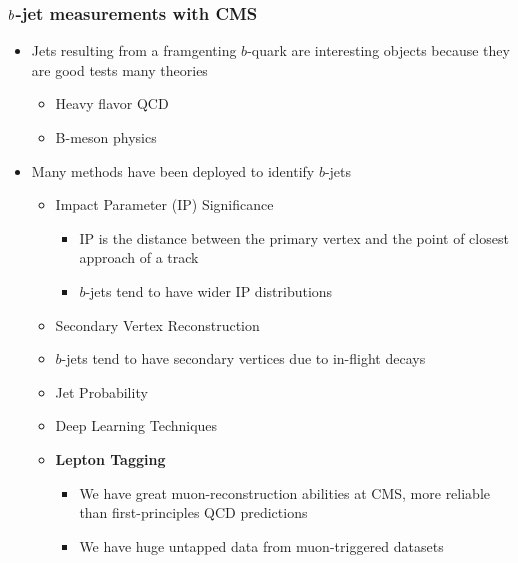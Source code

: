 \begin{frame}
  \frametitle{$\boldmath{b}$\textbf{-jet measurements with CMS}}
  \begin{itemize}
  \item Jets resulting from a framgenting $b$-quark are interesting objects because they are good tests many theories
    \begin{itemize}
    \item Heavy flavor QCD
    \item B-meson physics
    \end{itemize}
  \item Many methods have been deployed to identify $b$-jets
    \begin{itemize}
    \item Impact Parameter (IP) Significance
      \begin{itemize}
      \item IP is the distance between the primary vertex and the point of closest approach of a track
      \item $b$-jets tend to have wider IP distributions
      \end{itemize}
    \item Secondary Vertex Reconstruction
    \item $b$-jets tend to have secondary vertices due to in-flight decays
    \item Jet Probability
    \item Deep Learning Techniques
    \item \textbf{Lepton Tagging}
      \begin{itemize}
      \item We have great muon-reconstruction abilities at CMS, more reliable than first-principles QCD predictions
      \item We have huge untapped data from muon-triggered datasets
      \end{itemize}
    \end{itemize}
  \end{itemize}
\end{frame}
